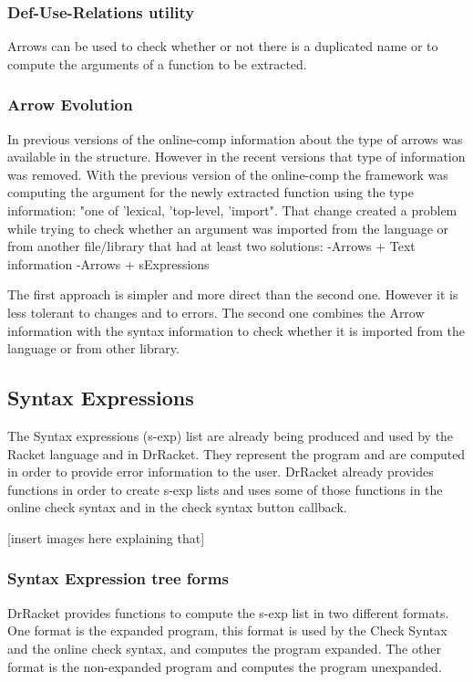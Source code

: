 \subsubsection{Def-Use-Relations utility}
Arrows can be used to check whether or not there is a duplicated name or to
compute the arguments of a function to be extracted.

\subsubsection{Arrow Evolution}
In previous versions of the online-comp information about the type of arrows
was available in the structure. However in the recent versions that type of
information was removed.
With the previous version of the online-comp the framework was computing the argument for the
newly extracted function using the type information: "one of 'lexical, 'top-level, 'import".
That change created a problem while trying to check whether an argument was imported
from the language or from another file/library that had at least two solutions:
  -Arrows + Text information
  -Arrows + sExpressions

The first approach is simpler and more direct than the second one. However it is
less tolerant to changes and to errors.
The second one combines the Arrow information with the syntax information to
check whether it is imported from the language or from other library.


\subsection{Syntax Expressions}
The Syntax expressions (s-exp) list are already being produced and used by the
Racket language and in DrRacket. They represent the program and are computed in
order to provide error information to the user.
DrRacket already provides functions in order to create s-exp lists and uses some of those
functions in the online check syntax and in the check syntax button callback.

[insert images here explaining that]


\subsubsection{Syntax Expression tree forms}
DrRacket provides functions to compute the s-exp list in two different formats.
One format is the expanded program, this format is used by the Check Syntax and
the online check syntax, and computes the program expanded.
The other format is the non-expanded program and computes the program unexpanded.


